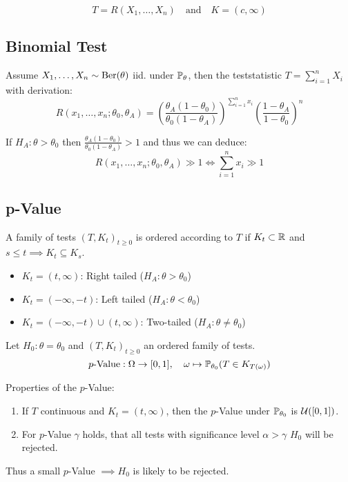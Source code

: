 \begin{definition*} \vspace{-7pt}
  \[T = R(X_1, \ldots, X_n) \quad \text{and} \quad K = (c, \infty)\]
\end{definition*}

\subsection{Binomial Test}
Assume \(X_1, \ldots, X_n \sim \Ber(\theta)\) iid. under \(\P_\theta\), then the teststatistic \(T = \sum_{i = 1}^n X_i\) with derivation: 
\[R\left(x_1, \ldots, x_n ; \theta_0, \theta_A\right) = \left(\frac{\theta_A\left(1-\theta_0\right)}{\theta_0\left(1-\theta_A\right)}\right)^{\sum_{i=1}^n x_i}\left(\frac{1-\theta_A}{1-\theta_0}\right)^n\]

If \(H_A: \theta > \theta_0\) then \(\frac{\theta_A\left(1-\theta_0\right)}{\theta_0\left(1-\theta_A\right)} > 1\) and thus we can deduce: 
\[R\left(x_1, \ldots, x_n ; \theta_0, \theta_A\right) \gg 1 \iff \sum_{i=1}^n x_i \gg 1\]

\subsection{p-Value}
\begin{definition*}
  A family of tests \((T, K_t)_{t \geq 0}\) is ordered according to \(T\) if \(K_t \subset \R\) and \(s \leq t \implies K_t \subseteq K_s\).
  \begin{itemize}
    \item \(K_t = (t, \infty)\): Right tailed (\(H_A: \theta > \theta_0\))
    \item \(K_t = (-\infty, -t)\): Left tailed (\(H_A: \theta < \theta_0\))
    \item \(K_t = (-\infty, -t) \cup (t, \infty)\): Two-tailed (\(H_A: \theta \neq \theta_0\))
  \end{itemize}
\end{definition*}

\begin{definition*}[\(p\)-Value]
  Let \(H_0: \theta = \theta_0\) and \((T, K_t)_{t \geq 0}\) an ordered family of tests.
  \[\text{\(p\)-Value}: \Omega \to [0, 1], \quad \omega \mapsto \P_{\theta_0}(T \in K_{T(\omega)})\]
\end{definition*}

Properties of the \(p\)-Value:
\begin{enumerate}
  \item If \(T\) continuous and \(K_t = (t, \infty)\), then the \(p\)-Value under \(\P_{\theta_0}\) is \(\Unif([0, 1])\).
  \item For \(p\)-Value \(\gamma\) holds, that all tests with significance level \(\alpha > \gamma\) \(H_0\) will be rejected.
\end{enumerate}

Thus a small \(p\)-Value \(\implies H_0\) is likely to be rejected.
